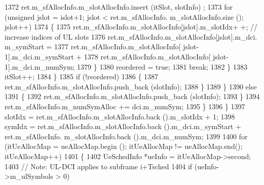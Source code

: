 \begin{DoxyCode}
1372                                                 ret.m\_sfAllocInfo.m\_slotAllocInfo.insert (itSlot, slotInfo)
      ;
1373                                                 \textcolor{keywordflow}{for} (\textcolor{keywordtype}{unsigned} jslot = islot+1; jslot < ret.m\_sfAllocInfo.
      m\_slotAllocInfo.size (); jslot++)
1374                                                 \{
1375                                                         ret.m\_sfAllocInfo.m\_slotAllocInfo[jslot].m\_slotIdx+
      +;       \textcolor{comment}{// increase indices of UL slots}
1376                                                         ret.m\_sfAllocInfo.m\_slotAllocInfo[jslot].m\_dci.
      m\_symStart =
1377                                                                         ret.m\_sfAllocInfo.m\_slotAllocInfo[
      jslot-1].m\_dci.m\_symStart +
1378                                                                         ret.m\_sfAllocInfo.m\_slotAllocInfo[
      jslot-1].m\_dci.m\_numSym;
1379                                                 \}
1380                                                 reordered = \textcolor{keyword}{true};
1381                                                 \textcolor{keywordflow}{break};
1382                                         \}
1383                                         itSlot++;
1384                                 \}
1385                                 \textcolor{keywordflow}{if} (!reordered)
1386                                 \{
1387                                         ret.m\_sfAllocInfo.m\_slotAllocInfo.push\_back (slotInfo);
1388                                 \}
1389                         \}
1390                         \textcolor{keywordflow}{else}
1391                         \{
1392                                 ret.m\_sfAllocInfo.m\_slotAllocInfo.push\_back (slotInfo);
1393                         \}
1394                         ret.m\_sfAllocInfo.m\_numSymAlloc += dci.m\_numSym;
1395                 \}
1396         \}
1397         slotIdx = ret.m\_sfAllocInfo.m\_slotAllocInfo.back ().m\_slotIdx + 1;
1398         symIdx = ret.m\_sfAllocInfo.m\_slotAllocInfo.back ().m\_dci.m\_symStart + ret.m\_sfAllocInfo.
      m\_slotAllocInfo.back ().m\_dci.m\_numSym;
1399 
1400         \textcolor{keywordflow}{for} (itUeAllocMap = ueAllocMap.begin (); itUeAllocMap != ueAllocMap.end(); itUeAllocMap++)
1401         \{
1402                 UeSchedInfo *ueInfo = itUeAllocMap->second;
1403                 \textcolor{comment}{// Note: UL-DCI applies to subframe i+Tsched}
1404                 \textcolor{keywordflow}{if} (ueInfo->m\_ulSymbols > 0)

\end{DoxyCode}
